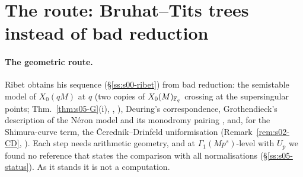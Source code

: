 \section{The route: Bruhat--Tits trees instead of bad reduction}\label{ss:s00-route}

\paragraph{The geometric route.} Ribet obtains his sequence (\S\ref{ss:s00-ribet}) from bad reduction: the semistable model of
$X_0(qM)$ at $q$ (two copies of $X_0(M)_{\mathbb{F}_q}$ crossing at the supersingular points; Thm.~\ref{thm:s05-G}(i), \stcited, \cite{DR}),
Deuring's correspondence, Grothendieck's description of the N\'eron model and its monodromy pairing \cite{SGA7}, and, for the
Shimura-curve term, the \v{C}erednik--Drinfeld uniformisation (Remark~\ref{rem:s02-CD}, \stcited). Each step needs arithmetic
geometry, and at $\Gamma_1(Mp^s)$-level with $U_p$ we found no reference that states the comparison with all normalisations
(\S\ref{ss:s05-status}). As it stands it is not a computation.

